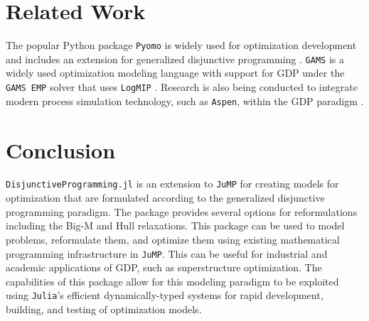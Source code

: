 \documentclass{juliacon}
\begin{document}
\section{Related Work}
The popular Python package \verb|Pyomo| \cite{bynum2021pyomo, hart2011pyomo} is widely used for optimization development and includes an extension for generalized disjunctive programming \cite{chen2022pyomo}. \verb|GAMS| \cite{Bussieck2004} is a widely used optimization modeling language with support for GDP under the \verb|GAMS EMP| solver that uses \verb|LogMIP| \cite{vecchietti1999logmip}. Research is also being conducted to integrate modern process simulation technology, such as \verb|Aspen|, within the GDP paradigm \cite{NAVARROAMOROS201413}.

\section{Conclusion}
\verb|DisjunctiveProgramming.jl| is an extension to \verb|JuMP| for creating models for optimization that are formulated according to the generalized disjunctive programming paradigm. The package provides several options for reformulations including the Big-M and Hull relaxations. This package can be used to model problems, reformulate them, and optimize them using existing mathematical programming infrastructure in \verb|JuMP|. This can be useful for industrial and academic applications of GDP, such as superstructure optimization. The capabilities of this package allow for this modeling paradigm to be exploited using \verb|Julia|'s efficient dynamically-typed systems for rapid development, building, and testing of optimization models.


\end{document}
